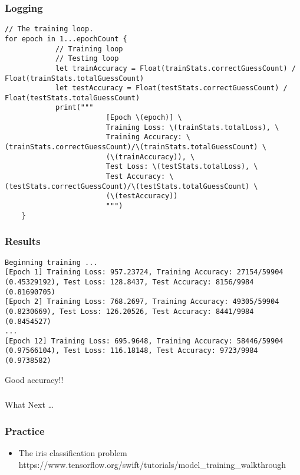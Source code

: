 \begin{frame}[fragile] \frametitle{Logging}

\begin{lstlisting}[basicstyle=\scriptsize]
// The training loop.
for epoch in 1...epochCount {
			// Training loop
			// Testing loop
			let trainAccuracy = Float(trainStats.correctGuessCount) / Float(trainStats.totalGuessCount)
			let testAccuracy = Float(testStats.correctGuessCount) / Float(testStats.totalGuessCount)
			print("""
						[Epoch \(epoch)] \
						Training Loss: \(trainStats.totalLoss), \
						Training Accuracy: \(trainStats.correctGuessCount)/\(trainStats.totalGuessCount) \
						(\(trainAccuracy)), \
						Test Loss: \(testStats.totalLoss), \
						Test Accuracy: \(testStats.correctGuessCount)/\(testStats.totalGuessCount) \
						(\(testAccuracy))
						""")			
    }
\end{lstlisting}

\end{frame}

\begin{frame}[fragile] \frametitle{Results}

\begin{lstlisting}[basicstyle=\scriptsize]
Beginning training ...
[Epoch 1] Training Loss: 957.23724, Training Accuracy: 27154/59904 (0.45329192), Test Loss: 128.8437, Test Accuracy: 8156/9984 (0.81690705) 
[Epoch 2] Training Loss: 768.2697, Training Accuracy: 49305/59904 (0.8230669), Test Loss: 126.20526, Test Accuracy: 8441/9984 (0.8454527) 
...
[Epoch 12] Training Loss: 695.9648, Training Accuracy: 58446/59904 (0.97566104), Test Loss: 116.18148, Test Accuracy: 9723/9984 (0.9738582)
\end{lstlisting}

Good accuracy!!

\end{frame}

\begin{frame}[fragile]\frametitle{}
\begin{center}
{\Large What Next \ldots }
\end{center}
\end{frame}

\begin{frame}[fragile] \frametitle{Practice}

\begin{itemize}
\item The iris classification problem https://www.tensorflow.org/swift/tutorials/model\_training\_walkthrough
\end{itemize}

\end{frame}


